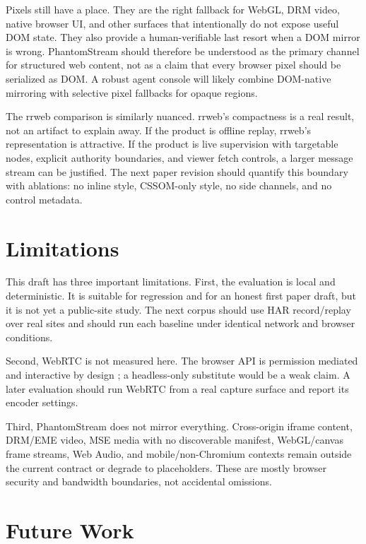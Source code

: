 \documentclass[conference]{IEEEtran}
\begin{document}
Pixels still have a place. They are the right fallback for WebGL, DRM video,
native browser UI, and other surfaces that intentionally do not expose useful DOM
state. They also provide a human-verifiable last resort when a DOM mirror is
wrong. PhantomStream should therefore be understood as the primary channel for
structured web content, not as a claim that every browser pixel should be
serialized as DOM. A robust agent console will likely combine DOM-native
mirroring with selective pixel fallbacks for opaque regions.

The rrweb comparison is similarly nuanced. rrweb's compactness is a real result,
not an artifact to explain away. If the product is offline replay, rrweb's
representation is attractive. If the product is live supervision with targetable
nodes, explicit authority boundaries, and viewer fetch controls, a larger
message stream can be justified. The next paper revision should quantify this
boundary with ablations: no inline style, CSSOM-only style, no side channels, and
no control metadata.

\section{Limitations}

This draft has three important limitations. First, the evaluation is local and
deterministic. It is suitable for regression and for an honest first paper draft,
but it is not yet a public-site study. The next corpus should use HAR
record/replay over real sites and should run each baseline under identical
network and browser conditions.

Second, WebRTC is not measured here. The browser API is permission mediated and
interactive by design \cite{screencapture}; a headless-only substitute would be a
weak claim. A later evaluation should run WebRTC from a real capture surface and
report its encoder settings.

Third, PhantomStream does not mirror everything. Cross-origin iframe content,
DRM/EME video, MSE media with no discoverable manifest, WebGL/canvas frame
streams, Web Audio, and mobile/non-Chromium contexts remain outside the current
contract or degrade to placeholders. These are mostly browser security and
bandwidth boundaries, not accidental omissions.

\section{Future Work}
\end{document}
